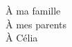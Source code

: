 \thispagestyle{empty}

\vspace*{5cm}
\begin{flushright}
	\sffamily
		À ma famille\\
		À mes parents\\
		À Célia
\end{flushright}